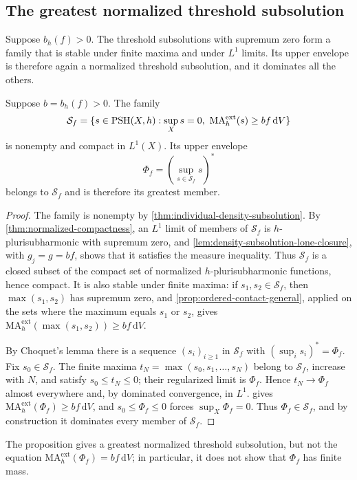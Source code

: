\subsection{The greatest normalized threshold subsolution}\label{subsec:threshold-envelope}

Suppose $b_h(f)>0$. The threshold subsolutions with supremum zero form a family that is stable under finite maxima and under $L^1$ limits. Its upper envelope is therefore again a normalized threshold subsolution, and it dominates all the others.

\begin{proposition}\label{prop:greatest-normalized-threshold}
Suppose $b=b_h(f)>0$. The family
\[
 \mathcal S_f=\{s\in\mathrm{PSH}(X,h):\sup_Xs=0,\
             \mathrm{MA}^{\mathrm{ext}}_h(s)\geq bf\,\mathrm{d}V\}
\]
is nonempty and compact in $L^1(X)$. Its upper envelope
\[
 \Phi_f=\left(\sup_{s\in\mathcal S_f}s\right)^*
\]
belongs to $\mathcal S_f$ and is therefore its greatest member.
\end{proposition}
\begin{proof}
The family is nonempty by \cref{thm:individual-density-subsolution}. By \cref{thm:normalized-compactness}, an $L^1$ limit of members of $\mathcal S_f$ is $h$-plurisubharmonic with supremum zero, and \cref{lem:density-subsolution-lone-closure}, with $g_j=g=bf$, shows that it satisfies the measure inequality. Thus $\mathcal S_f$ is a closed subset of the compact set of normalized $h$-plurisubharmonic functions, hence compact. It is also stable under finite maxima: if $s_1,s_2\in\mathcal S_f$, then $\max(s_1,s_2)$ has supremum zero, and \cref{prop:ordered-contact-general}, applied on the sets where the maximum equals $s_1$ or $s_2$, gives $\mathrm{MA}^{\mathrm{ext}}_h(\max(s_1,s_2))\geq bf\,\mathrm{d}V$.

By Choquet's lemma there is a sequence $(s_i)_{i\geq1}$ in $\mathcal S_f$ with $(\sup_is_i)^*=\Phi_f$. Fix $s_0\in\mathcal S_f$. The finite maxima $t_N=\max(s_0,s_1,\ldots,s_N)$ belong to $\mathcal S_f$, increase with $N$, and satisfy $s_0\leq t_N\leq0$; their regularized limit is $\Phi_f$. Hence $t_N\to\Phi_f$ almost everywhere and, by dominated convergence, in $L^1$.  gives $\mathrm{MA}^{\mathrm{ext}}_h(\Phi_f)\geq bf\,\mathrm{d}V$, and $s_0\leq\Phi_f\leq0$ forces $\sup_X\Phi_f=0$. Thus $\Phi_f\in\mathcal S_f$, and by construction it dominates every member of $\mathcal S_f$.
\end{proof}

The proposition gives a greatest normalized threshold subsolution, but not the equation $\mathrm{MA}^{\mathrm{ext}}_h(\Phi_f)=bf\,\mathrm{d}V$; in particular, it does not show that $\Phi_f$ has finite mass.
